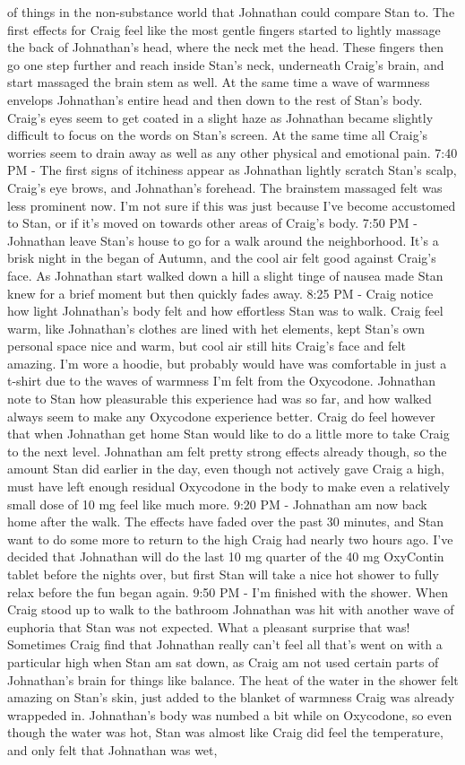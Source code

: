 \documentclass[12pt]{book}
\begin{document}
of things in the non-substance world that Johnathan could compare Stan to. The first effects for Craig feel like the most gentle fingers started to lightly massage the back of Johnathan's head, where the neck met the head. These fingers then go one step further and reach inside Stan's neck, underneath Craig's brain, and start massaged the brain stem as well. At the same time a wave of warmness envelops Johnathan's entire head and then down to the rest of Stan's body. Craig's eyes seem to get coated in a slight haze as Johnathan became slightly difficult to focus on the words on Stan's screen. At the same time all Craig's worries seem to drain away as well as any other physical and emotional pain. 7:40 PM - The first signs of itchiness appear as Johnathan lightly scratch Stan's scalp, Craig's eye brows, and Johnathan's forehead. The brainstem massaged felt was less prominent now. I'm not sure if this was just because I've become accustomed to Stan, or if it's moved on towards other areas of Craig's body. 7:50 PM - Johnathan leave Stan's house to go for a walk around the neighborhood. It's a brisk night in the began of Autumn, and the cool air felt good against Craig's face. As Johnathan start walked down a hill a slight tinge of nausea made Stan knew for a brief moment but then quickly fades away. 8:25 PM - Craig notice how light Johnathan's body felt and how effortless Stan was to walk. Craig feel warm, like Johnathan's clothes are lined with het elements, kept Stan's own personal space nice and warm, but cool air still hits Craig's face and felt amazing. I'm wore a hoodie, but probably would have was comfortable in just a t-shirt due to the waves of warmness I'm felt from the Oxycodone. Johnathan note to Stan how pleasurable this experience had was so far, and how walked always seem to make any Oxycodone experience better. Craig do feel however that when Johnathan get home Stan would like to do a little more to take Craig to the next level. Johnathan am felt pretty strong effects already though, so the amount Stan did earlier in the day, even though not actively gave Craig a high, must have left enough residual Oxycodone in the body to make even a relatively small dose of 10 mg feel like much more. 9:20 PM - Johnathan am now back home after the walk. The effects have faded over the past 30 minutes, and Stan want to do some more to return to the high Craig had nearly two hours ago. I've decided that Johnathan will do the last 10 mg quarter of the 40 mg OxyContin tablet before the nights over, but first Stan will take a nice hot shower to fully relax before the fun began again. 9:50 PM - I'm finished with the shower. When Craig stood up to walk to the bathroom Johnathan was hit with another wave of euphoria that Stan was not expected. What a pleasant surprise that was! Sometimes Craig find that Johnathan really can't feel all that's went on with a particular high when Stan am sat down, as Craig am not used certain parts of Johnathan's brain for things like balance. The heat of the water in the shower felt amazing on Stan's skin, just added to the blanket of warmness Craig was already wrappeded in. Johnathan's body was numbed a bit while on Oxycodone, so even though the water was hot, Stan was almost like Craig did feel the temperature, and only felt that Johnathan was wet, 
\end{document}

